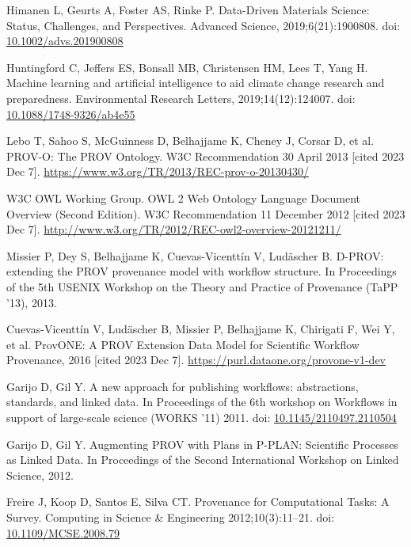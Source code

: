 \documentclass[10pt,letterpaper]{article}
\begin{document}
\begin{thebibliography}{10}
\begin{small}
Himanen L, Geurts A, Foster AS, Rinke P.
Data-Driven Materials Science: Status, Challenges, and Perspectives.
Advanced Science, 2019;6(21):1900808.
doi: \href{https://doi.org/10.1002/advs.201900808}{10.1002/advs.201900808}

Huntingford C, Jeffers ES, Bonsall MB, Christensen HM, Lees T, Yang H.
Machine learning and artificial intelligence to aid climate change research and preparedness.
Environmental Research Letters, 2019;14(12):124007.
doi: \href{https://doi.org/10.1088/1748-9326/ab4e55}{10.1088/1748-9326/ab4e55}

Lebo T, Sahoo S, McGuinness D, Belhajjame K, Cheney J, Corsar D, et al.
PROV-O: The PROV Ontology.
W3C Recommendation 30 April 2013 [cited 2023 Dec 7].
\url{https://www.w3.org/TR/2013/REC-prov-o-20130430/}

W3C OWL Working Group.
OWL 2 Web Ontology Language Document Overview (Second Edition). W3C Recommendation 11 December 2012 [cited 2023 Dec 7].
\url{http://www.w3.org/TR/2012/REC-owl2-overview-20121211/}

Missier P, Dey S, Belhajjame K, Cuevas-Vicenttín V, Ludäscher B.
D-PROV: extending the PROV provenance model with workflow structure.
In Proceedings of the 5th USENIX Workshop on the Theory and Practice of Provenance (TaPP '13), 2013.

Cuevas-Vicenttín V, Ludäscher B, Missier P, Belhajjame K, Chirigati F, Wei Y, et al.
ProvONE: A PROV Extension Data Model for Scientific Workflow Provenance, 2016 [cited 2023 Dec 7].
\url{https://purl.dataone.org/provone-v1-dev}

Garijo D, Gil Y.
A new approach for publishing workflows: abstractions, standards, and linked data.
In Proceedings of the 6th workshop on Workflows in support of large-scale science (WORKS '11) 2011.
doi: \href{https://doi.org/10.1145/2110497.2110504}{10.1145/2110497.2110504}

Garijo D, Gil Y.
Augmenting PROV with Plans in P-PLAN: Scientific Processes as Linked Data.
In Proceedings of the Second International Workshop on Linked Science, 2012.

Freire J, Koop D, Santos E, Silva CT.
Provenance for Computational Tasks: A Survey.
Computing in Science \& Engineering 2012;{10}(3):11--21.
doi: \href{https://doi.org/10.1109/MCSE.2008.79}{10.1109/MCSE.2008.79}


\end{small}
\end{thebibliography}
\end{document}
